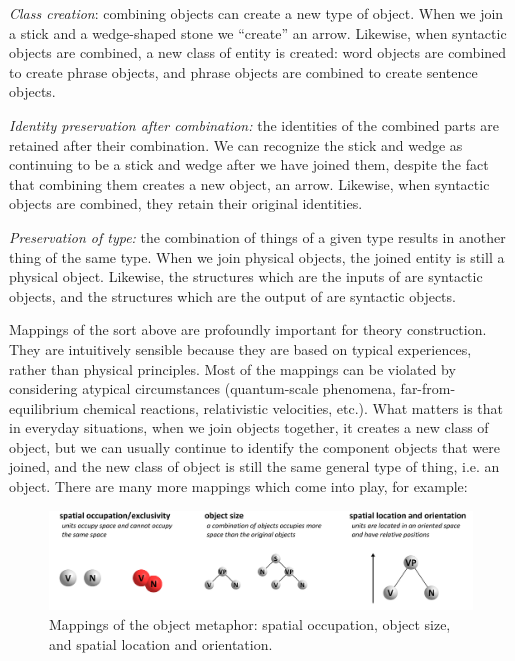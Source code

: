 \textit{Class creation}: combining objects can create a new type of object. When we join a stick and a wedge-shaped stone we “create” an arrow. Likewise, when syntactic objects are combined, a new class of entity is created: word objects are combined to create phrase objects, and phrase objects are combined to create sentence objects. 

\textit{Identity preservation after combination:} the identities of the combined parts are retained after their combination. We can recognize the stick and wedge as continuing to be a stick and wedge after we have joined them, despite the fact that combining them creates a new object, an arrow. Likewise, when syntactic objects are combined, they retain their original identities.

\textit{Preservation of type:} the combination of things of a given type results in another thing of the same type. When we join physical objects, the joined entity is still a physical object. Likewise, the structures which are the inputs of {} are syntactic objects, and the structures which are the output of {} are syntactic objects.

  Mappings of the sort above are profoundly important for theory construction. They are intuitively sensible because they are based on typical experiences, rather than physical principles. Most of the mappings can be violated by considering atypical circumstances (quantum-scale phenomena, far-from-equilibrium chemical reactions, relativistic velocities, etc.). What matters is that in everyday situations, when we join objects together, it creates a new class of object, but we can usually continue to identify the component objects that were joined, and the new class of object is still the same general type of thing, i.e. an object. There are many more mappings which come into play, for example:

  
\begin{figure}
\includegraphics[width=\textwidth]{figures/Tilsen-img30.png}
\caption{Mappings of the object metaphor: spatial occupation, object size, and spatial location and orientation.}
\label{fig:3:2}
\end{figure}
 

